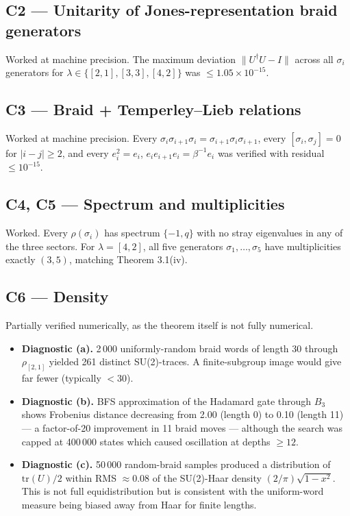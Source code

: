 \documentclass[11pt]{article}
\begin{document}
\subsection*{C2 --- Unitarity of Jones-representation braid generators}
Worked at machine precision. The maximum deviation $\|U^\dagger U - I\|$ across all $\sigma_i$ generators for $\lambda \in \{[2,1], [3,3], [4,2]\}$ was $\le 1.05 \times 10^{-15}$.

\subsection*{C3 --- Braid + Temperley--Lieb relations}
Worked at machine precision. Every $\sigma_i \sigma_{i+1} \sigma_i = \sigma_{i+1} \sigma_i \sigma_{i+1}$, every $[\sigma_i, \sigma_j] = 0$ for $|i - j| \ge 2$, and every $e_i^2 = e_i$, $e_i e_{i+1} e_i = \beta^{-1} e_i$ was verified with residual $\le 10^{-15}$.

\subsection*{C4, C5 --- Spectrum and multiplicities}
Worked. Every $\rho(\sigma_i)$ has spectrum $\{-1, q\}$ with no stray eigenvalues in any of the three sectors. For $\lambda = [4,2]$, all five generators $\sigma_1, \ldots, \sigma_5$ have multiplicities exactly $(3, 5)$, matching Theorem 3.1(iv).

\subsection*{C6 --- Density}
Partially verified numerically, as the theorem itself is not fully numerical.
\begin{itemize}
  \item \textbf{Diagnostic (a).} 2\,000 uniformly-random braid words of length 30 through $\rho_{[2,1]}$ yielded 261 distinct SU(2)-traces. A finite-subgroup image would give far fewer (typically $< 30$).
  \item \textbf{Diagnostic (b).} BFS approximation of the Hadamard gate through $B_3$ shows Frobenius distance decreasing from 2.00 (length 0) to 0.10 (length 11) --- a factor-of-20 improvement in 11 braid moves --- although the search was capped at 400\,000 states which caused oscillation at depths $\ge 12$.
  \item \textbf{Diagnostic (c).} 50\,000 random-braid samples produced a distribution of $\mathrm{tr}(U)/2$ within RMS $\approx 0.08$ of the SU(2)-Haar density $(2/\pi)\sqrt{1 - x^2}$. This is not full equidistribution but is consistent with the uniform-word measure being biased away from Haar for finite lengths.
\end{itemize}
\end{document}
